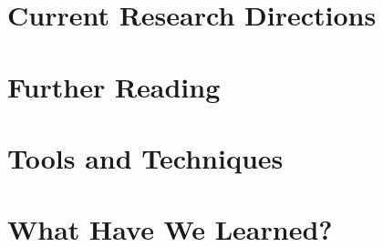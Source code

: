 \section{Current Research Directions}
\section{Further Reading}
\section{Tools and Techniques} 
\section{What Have We Learned?}

\nocite{*}

 
